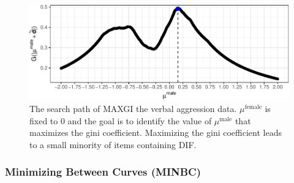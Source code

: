 \documentclass[
  english,
  man,floatsintext]{apa6}
\begin{document}
\begin{figure}[h]

{\centering \includegraphics{paper_apa_files/figure-latex/thegini-1} 

}

\caption{The search path of MAXGI the verbal aggression data. $\mu^\text{female}$ is fixed to 0 and the goal is to identify the value of $\mu^\text{male}$ that maximizes the gini coefficient. Maximizing the gini coefficient leads to a small minority of items containing DIF.}\label{fig:thegini}
\end{figure}

\hypertarget{minimizing-between-curves-minbc}{%
\subsubsection{Minimizing Between Curves (MINBC)}\label{minimizing-between-curves-minbc}}
\end{document}
